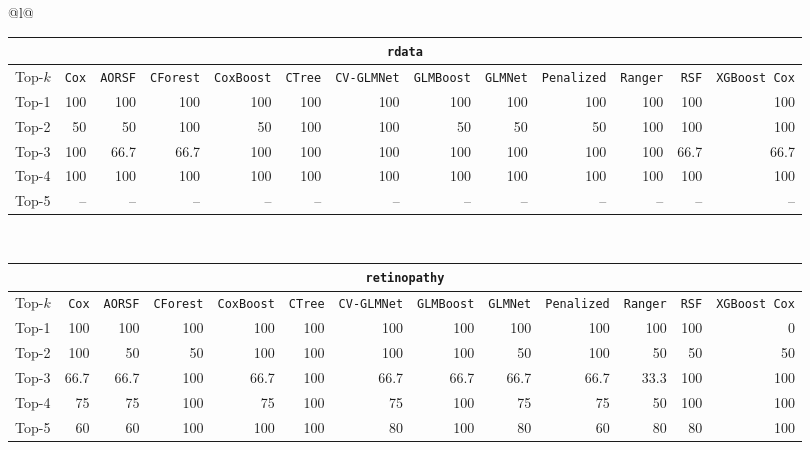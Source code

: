 \begin{longtable}{@{}l@{}}
\begin{tabular}{@{}l*{12}{r}@{}}
\multicolumn{13}{c}{\texttt{rdata}} \\
\midrule
Top-$k$ & \texttt{Cox} & \texttt{AORSF} & \texttt{CForest} & \texttt{CoxBoost} & \texttt{CTree} & \texttt{CV-GLMNet} & \texttt{GLMBoost} & \texttt{GLMNet} & \texttt{Penalized} & \texttt{Ranger} & \texttt{RSF} & \texttt{XGBoost Cox} \\
\midrule
Top-1 & 100 & 100 & 100 & 100 & 100 & 100 & 100 & 100 & 100 & 100 & 100 & 100 \\
Top-2 & 50 & 50 & 100 & 50 & 100 & 100 & 50 & 50 & 50 & 100 & 100 & 100 \\
Top-3 & 100 & 66.7 & 66.7 & 100 & 100 & 100 & 100 & 100 & 100 & 100 & 66.7 & 66.7 \\
Top-4 & 100 & 100 & 100 & 100 & 100 & 100 & 100 & 100 & 100 & 100 & 100 & 100 \\
Top-5 & -- & -- & -- & -- & -- & -- & -- & -- & -- & -- & -- & -- \\
\end{tabular} \\
\midrule

\begin{tabular}{@{}l*{12}{r}@{}}
\multicolumn{13}{c}{\texttt{retinopathy}} \\
\midrule
Top-$k$ & \texttt{Cox} & \texttt{AORSF} & \texttt{CForest} & \texttt{CoxBoost} & \texttt{CTree} & \texttt{CV-GLMNet} & \texttt{GLMBoost} & \texttt{GLMNet} & \texttt{Penalized} & \texttt{Ranger} & \texttt{RSF} & \texttt{XGBoost Cox} \\
\midrule
Top-1 & 100 & 100 & 100 & 100 & 100 & 100 & 100 & 100 & 100 & 100 & 100 & 0 \\
Top-2 & 100 & 50 & 50 & 100 & 100 & 100 & 100 & 50 & 100 & 50 & 50 & 50 \\
Top-3 & 66.7 & 66.7 & 100 & 66.7 & 100 & 66.7 & 66.7 & 66.7 & 66.7 & 33.3 & 100 & 100 \\
Top-4 & 75 & 75 & 100 & 75 & 100 & 75 & 100 & 75 & 75 & 50 & 100 & 100 \\
Top-5 & 60 & 60 & 100 & 100 & 100 & 80 & 100 & 80 & 60 & 80 & 80 & 100 \\
\end{tabular} \\
\midrule


\end{longtable}
